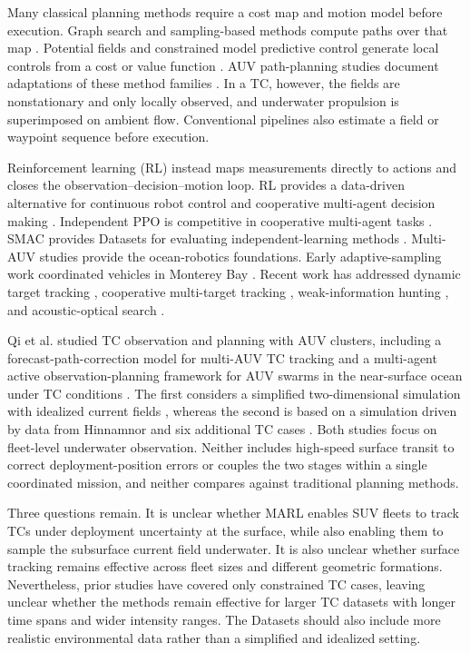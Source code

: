 \documentclass[a4paper,fleqn]{cas-dc}
\begin{document}
Many classical planning methods require a cost map and motion model before
execution. Graph search and sampling-based methods compute paths over that map
\citep{r43,r44,r45}. Potential fields and constrained model predictive control
generate local controls from a cost or value function \citep{r46,r47}. AUV
path-planning studies document adaptations of these method families
\citep{r48}. In a TC, however, the fields are nonstationary and only locally
observed, and underwater propulsion is superimposed on ambient flow.
Conventional pipelines also estimate a field or waypoint sequence before
execution.

Reinforcement learning (RL) instead maps measurements directly to actions and
closes the observation--decision--motion loop. RL provides a data-driven
alternative for continuous robot control and cooperative multi-agent
decision making \citep{r52,r53,r55,r56}. Independent PPO is competitive in
cooperative multi-agent tasks \citep{r41,r42}. SMAC provides Datasets for
evaluating independent-learning methods \citep{r57}. Multi-AUV studies provide
the ocean-robotics foundations. Early adaptive-sampling work coordinated
vehicles in Monterey Bay \citep{r32}. Recent work has addressed dynamic target
tracking \citep{r33}, cooperative multi-target tracking \citep{r34},
weak-information hunting \citep{r35}, and acoustic-optical search \citep{r36}.

Qi et al. studied TC observation and planning with AUV clusters, including a
forecast-path-correction model for multi-AUV TC tracking \citep{r26} and a
multi-agent active observation-planning framework for AUV swarms in the
near-surface ocean under TC conditions \citep{r27}. The first considers a simplified
two-dimensional simulation with idealized current fields \citep{r26}, whereas
the second is based on a simulation driven by data from Hinnamnor and six additional
TC cases \citep{r27}. Both studies focus on fleet-level underwater
observation. Neither includes high-speed surface transit to correct
deployment-position errors or couples the two stages within a single coordinated
mission, and neither compares against traditional planning methods.

Three questions remain. It is unclear whether MARL enables SUV fleets to track
TCs under deployment uncertainty at the surface, while also enabling them to
sample the subsurface current field underwater.
It is also unclear whether surface tracking remains effective across fleet
sizes and different geometric formations.
Nevertheless, prior studies have covered only constrained TC cases, leaving
unclear whether the methods remain effective for larger TC datasets with longer
time spans and wider intensity ranges. The Datasets should also include more
realistic environmental data rather than a simplified and idealized setting.
\end{document}
